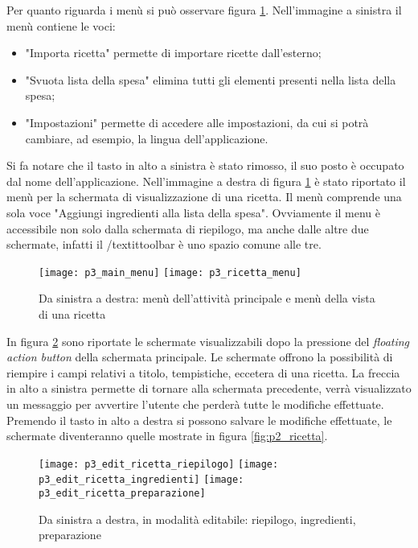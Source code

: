 Per quanto riguarda i menù si può osservare figura \ref{fig:p3_menu}.
Nell'immagine a sinistra il menù contiene le voci:
\begin{itemize}
  \item "Importa ricetta" permette di importare ricette dall'esterno;
  \item "Svuota lista della spesa" elimina tutti gli elementi presenti nella lista della spesa;
  \item "Impostazioni" permette di accedere alle impostazioni, da cui si potrà cambiare, ad esempio, la lingua dell'applicazione.
\end{itemize}
Si fa notare che il tasto in alto a sinistra è stato rimosso, il suo posto è occupato dal nome dell'applicazione.
Nell'immagine a destra di figura \ref{fig:p3_menu} è stato riportato il menù per la schermata di visualizzazione di una ricetta.
Il menù comprende una sola voce "Aggiungi ingredienti alla lista della spesa".
Ovviamente il menu è accessibile non solo dalla schermata di riepilogo, ma anche dalle altre due schermate, infatti il /textit{toolbar} è uno spazio comune alle tre.
\begin{figure}[ht]
  \begin{center}
    \texttt{[image: p3\_main\_menu]}
    \texttt{[image: p3\_ricetta\_menu]}
    \caption{Da sinistra a destra: menù dell'attività principale e menù della vista di una ricetta}
    \label{fig:p3_menu}
  \end{center}
\end{figure}
\clearpage

In figura \ref{fig:p3_edit_ricetta} sono riportate le schermate visualizzabili dopo la pressione del \textit{floating action button} della schermata principale.
Le schermate offrono la possibilità di riempire i campi relativi a titolo, tempistiche, eccetera di una ricetta.
La freccia in alto a sinistra permette di tornare alla schermata precedente, verrà visualizzato un messaggio per avvertire l'utente che perderà tutte le modifiche effettuate.
Premendo il tasto in alto a destra si possono salvare le modifiche effettuate, le schermate diventeranno quelle mostrate in figura \ref{fig:p2_ricetta}.

\begin{figure}[ht]
  \begin{center}
    \texttt{[image: p3\_edit\_ricetta\_riepilogo]}
    \texttt{[image: p3\_edit\_ricetta\_ingredienti]}
    \texttt{[image: p3\_edit\_ricetta\_preparazione]}
    \caption{Da sinistra a destra, in modalità editabile: riepilogo, ingredienti, preparazione}
    \label{fig:p3_edit_ricetta}
  \end{center}
\end{figure}

